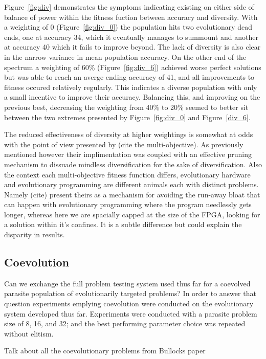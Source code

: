 Figure~\ref{fig:div} demonstrates the symptoms indicating existing on either side of
balance of power within the fitness fuction between accuracy and diversity. With a
weighting of 0 (Figure~\ref{fig:div_0}) the population hits two evolutionary dead ends,
one at accuracy 34, which it eventually manages to summount and another at accuracy 40
which it fails to improve beyond. The lack of diversity is also clear in the narrow
variance in mean population accuracy. On the other end of the spectrum a weighting of
60\% (Figure~\ref{fig:div_6}) achieved worse perfect solutions but was able to reach
an averge ending accuracy of 41, and all improvements to fitness occured relatively
regularly. This indicates a diverse population with only a small incentive to improve
their accuracy. Balancing this, and improving on the previous best, decreasing the
weighting from 40\% to 20\% seemed to better sit between the two extremes presented
by Figure~\ref{fig:div_0} and Figure~\ref{div_6}.

The reduced effectiveness of diversity at higher weightings is somewhat at odds with
the point of view presented by (\todo cite the multi-objective). As previously mentioned
however their implimentation was coupled with an effective pruning mechanism to dissuade
mindless diversification for the sake of diversification. Also the context each multi-objective
fitness function differs, evolutionary hardware and evolutionary programming are different
animals each with distinct problems. Namely (\todo cite) present theirs as a mechanism
for avoiding the run-away bloat that can happen with evolutionary programming where
the program needlessly gets longer, whereas here we are spacially capped at the size of
the FPGA, looking for a solution within it's confines. It is a subtle difference but
could explain the disparity in results.

\subsection{Coevolution}

Can we exchange the full problem testing system used thus far for a coevolved
parasite population of evolutionarily targeted problems? In order to answer that
question experiments emplying coevolution were conducted on the evolutionary
system developed thus far. Experiments were conducted with a parasite problem
size of 8, 16, and 32; and the best performing parameter choice was repeated
without elitism.

\todo Talk about all the coevolutionary problems from Bullocks paper

